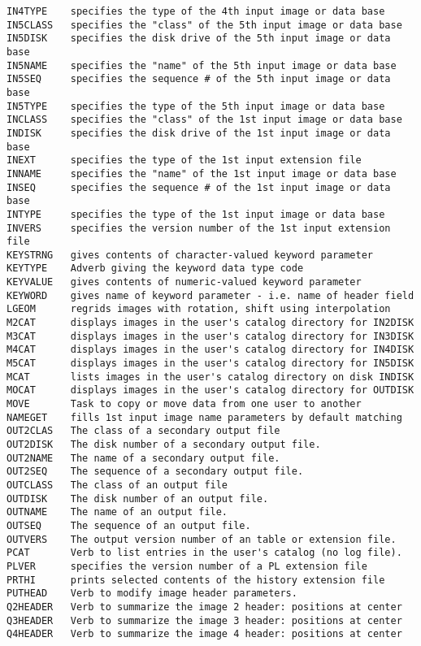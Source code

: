 \begin{verbatim}
IN4TYPE    specifies the type of the 4th input image or data base
IN5CLASS   specifies the "class" of the 5th input image or data base
IN5DISK    specifies the disk drive of the 5th input image or data base
IN5NAME    specifies the "name" of the 5th input image or data base
IN5SEQ     specifies the sequence # of the 5th input image or data base
IN5TYPE    specifies the type of the 5th input image or data base
INCLASS    specifies the "class" of the 1st input image or data base
INDISK     specifies the disk drive of the 1st input image or data base
INEXT      specifies the type of the 1st input extension file
INNAME     specifies the "name" of the 1st input image or data base
INSEQ      specifies the sequence # of the 1st input image or data base
INTYPE     specifies the type of the 1st input image or data base
INVERS     specifies the version number of the 1st input extension file
KEYSTRNG   gives contents of character-valued keyword parameter
KEYTYPE    Adverb giving the keyword data type code
KEYVALUE   gives contents of numeric-valued keyword parameter
KEYWORD    gives name of keyword parameter - i.e. name of header field
LGEOM      regrids images with rotation, shift using interpolation
M2CAT      displays images in the user's catalog directory for IN2DISK
M3CAT      displays images in the user's catalog directory for IN3DISK
M4CAT      displays images in the user's catalog directory for IN4DISK
M5CAT      displays images in the user's catalog directory for IN5DISK
MCAT       lists images in the user's catalog directory on disk INDISK
MOCAT      displays images in the user's catalog directory for OUTDISK
MOVE       Task to copy or move data from one user to another
NAMEGET    fills 1st input image name parameters by default matching
OUT2CLAS   The class of a secondary output file
OUT2DISK   The disk number of a secondary output file.
OUT2NAME   The name of a secondary output file.
OUT2SEQ    The sequence of a secondary output file.
OUTCLASS   The class of an output file
OUTDISK    The disk number of an output file.
OUTNAME    The name of an output file.
OUTSEQ     The sequence of an output file.
OUTVERS    The output version number of an table or extension file.
PCAT       Verb to list entries in the user's catalog (no log file).
PLVER      specifies the version number of a PL extension file
PRTHI      prints selected contents of the history extension file
PUTHEAD    Verb to modify image header parameters.
Q2HEADER   Verb to summarize the image 2 header: positions at center
Q3HEADER   Verb to summarize the image 3 header: positions at center
Q4HEADER   Verb to summarize the image 4 header: positions at center

\end{verbatim}
